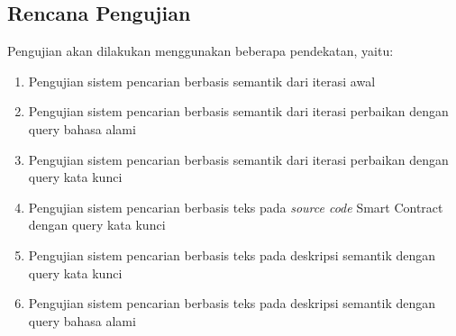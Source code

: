 \subsection{Rencana Pengujian}

Pengujian akan dilakukan menggunakan beberapa pendekatan, yaitu:

\begin{enumerate}
	\item Pengujian sistem pencarian berbasis semantik dari iterasi awal
	\item Pengujian sistem pencarian berbasis semantik dari iterasi perbaikan dengan query bahasa alami
	\item Pengujian sistem pencarian berbasis semantik dari iterasi perbaikan dengan query kata kunci
	\item Pengujian sistem pencarian berbasis teks pada \textit{source code} Smart Contract dengan query kata kunci
	\item Pengujian sistem pencarian berbasis teks pada deskripsi semantik dengan query kata kunci
	\item Pengujian sistem pencarian berbasis teks pada deskripsi semantik dengan query bahasa alami
\end{enumerate}